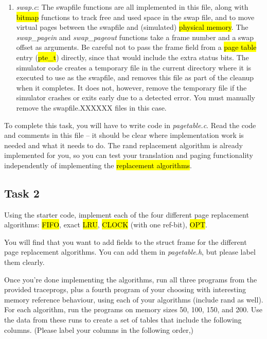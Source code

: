 \documentclass[12pt]{article}
\begin{document}
\begin{enumerate}[1.]
    \item \textit{swap.c}: The swapfile functions are all implemented in this
    file, along with \hl{bitmap} functions to track free and used space in the swap
    file, and to move virtual pages between the swapfile and (simulated)
    \hl{physical memory}. The \textit{swap\_pagein} and \textit{swap\_pageout}
    functions take a frame number and a swap offset as arguments. Be careful not
    to pass the frame field from a \hl{page table} entry (\hl{pte\_t}) directly, since that
    would include the extra status bits. The simulator code creates a temporary
    file in the current directory where it is executed to use as the swapfile,
    and removes this file as part of the cleanup when it completes. It does not,
    however, remove the temporary file if the simulator crashes or exits early
    due to a detected error. You must manually remove the swapfile.XXXXXX files
    in this case.
\end{enumerate}

\bigskip

\noindent To complete this task, you will have to write code in \textit{pagetable.c}. Read the code
and comments in this file -- it should be clear where implementation work is
needed and what it needs to do. The rand replacement algorithm is already implemented
for you, so you can test your translation and paging functionality independently
of implementing the \hl{replacement algorithms}.

\subsection{Task 2}

\bigskip

\noindent Using the starter code, implement each of the four different page replacement
algorithms: \hl{FIFO}, exact \hl{LRU}, \hl{CLOCK} (with one ref-bit), \hl{OPT}.

\bigskip

\noindent You will find that you want to add fields to the struct frame for the different
page replacement algorithms. You can add them in \textit{pagetable.h}, but please label
them clearly.

\bigskip

\noindent Once you're done implementing the algorithms, run all three programs from the
provided traceprogs, plus a fourth program of your choosing with interesting memory
reference behaviour, using each of your algorithms (include rand as well). For each
algorithm, run the programs on memory sizes 50, 100, 150, and 200. Use the data
from these runs to create a set of tables that include the following columns.
 (Please label your columns in the following order,)
\end{document}
